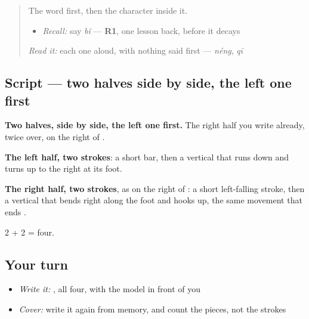\label{lesson:ZH-W153-bi-compare}



\begin{quote}
The word first, then the character inside it.

\begin{itemize}
\raggedright
  \item \emph{Recall:} say \emph{bǐ} — \textbf{R1}, one lesson back, before it decays
\end{itemize}

\begin{quote}
 
\end{quote}

\emph{Read it:} each one aloud, with nothing said first — \emph{néng}, \emph{qī}
\end{quote}

\subsection*{Script — two halves side by side, the left one first}

\begin{quote}
\end{quote}

\textbf{Two halves, side by side, the left one first.} The right half you write already, twice over, on the right of .

\textbf{The left half, two strokes}: a short bar, then a vertical that runs down and turns up to the right at its foot.

\textbf{The right half, two strokes}, as on the right of : a short left-falling stroke, then a vertical that bends right along the foot and hooks up, the same movement that ends .

2 + 2 = four.

\subsection*{Your turn}
\begin{itemize}
\raggedright
  \item \emph{Write it:} , all four, with the model in front of you
  \item \emph{Cover:} write it again from memory, and count the pieces, not the strokes
\end{itemize}


